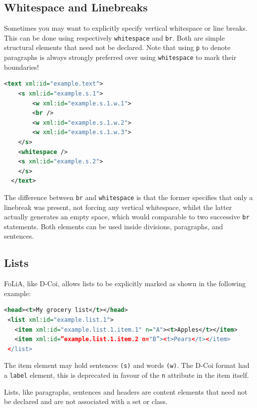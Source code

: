 \documentclass[a4paper,12pt]{report}
\begin{document}
\subsection{Whitespace and Linebreaks}

Sometimes you may want to explicitly specify vertical whitespace or line breaks. This can be done using respectively \texttt{whitespace} and \texttt{br}. Both are simple structural elements that need not be declared. Note that using \texttt{p} to denote paragraphs is always strongly preferred over using \texttt{whitespace} to mark their boundaries!

\begin{lstlisting}[language=xml]
  <text xml:id="example.text">
    <s xml:id="example.s.1">
        <w xml:id="example.s.1.w.1">
        <br />
        <w xml:id="example.s.1.w.2">
        <w xml:id="example.s.1.w.3">
    </s>
    <whitespace />
    <s xml:id="example.s.2">
    </s>
  </text>
\end{lstlisting}

The difference between \texttt{br} and \texttt{whitespace} is that the former specifies that only a linebreak was present, not forcing any vertical whitespace, whilst the latter actually generates an empty space, which would comparable to two successive \texttt{br} statements. Both elements can be used inside divisions, paragraphs, and sentences.

\subsection{Lists}

FoLiA, like D-Coi, allows lists to be explicitly marked as shown in the following example:

\begin{lstlisting}[language=xml]
 <head><t>My grocery list</t></head>
 <list xml:id="example.list.1">
   <item xml:id="example.list.1.item.1" n="A"><t>Apples</t></item>
   <item xml:id=”example.list.1.item.2 n="B”><t>Pears</t></item>
 </list>
\end{lstlisting}

The item element may hold sentences \texttt{(s)} and words \texttt{(w)}. The D-Coi format had a \texttt{label} element, this is deprecated in favour of the \texttt{n} attribute in the item itself.

Lists, like paragraphs, sentences and headers are content elements that need not be declared and are not associated with a set or class.
\end{document}
